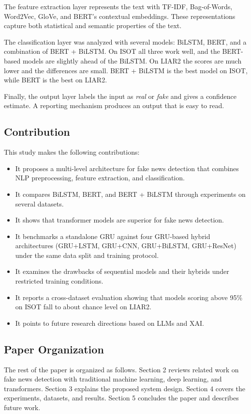 \documentclass[runningheads]{llncs}
\begin{document}
The feature extraction layer represents the text with TF-IDF, Bag-of-Words, Word2Vec, GloVe, and BERT's contextual embeddings. These representations capture both statistical and semantic properties of the text.

The classification layer was analyzed with several models: BiLSTM, BERT, and a combination of BERT + BiLSTM. On ISOT all three work well, and the BERT-based models are slightly ahead of the BiLSTM. On LIAR2 the scores are much lower and the differences are small. BERT + BiLSTM is the best model on ISOT, while BERT is the best on LIAR2.

Finally, the output layer labels the input as \textit{real} or \textit{fake} and gives a confidence estimate. A reporting mechanism produces an output that is easy to read.

\subsection{Contribution}

This study makes the following contributions:

\begin{itemize}
\item It proposes a multi-level architecture for fake news detection that combines NLP preprocessing, feature extraction, and classification.
\item It compares BiLSTM, BERT, and BERT + BiLSTM through experiments on several datasets.
\item It shows that transformer models are superior for fake news detection.
\item It benchmarks a standalone GRU against four GRU-based hybrid architectures (GRU+LSTM, GRU+CNN, GRU+BiLSTM, GRU+ResNet) under the same data split and training protocol.
\item It examines the drawbacks of sequential models and their hybrids under restricted training conditions.
\item It reports a cross-dataset evaluation showing that models scoring above 95\% on ISOT fall to about chance level on LIAR2.
\item It points to future research directions based on LLMs and XAI.
\end{itemize}


\subsection{Paper Organization}
The rest of the paper is organized as follows. Section 2 reviews related work on fake news detection with traditional machine learning, deep learning, and transformers. Section 3 explains the proposed system design. Section 4 covers the experiments, datasets, and results. Section 5 concludes the paper and describes future work.
\end{document}
